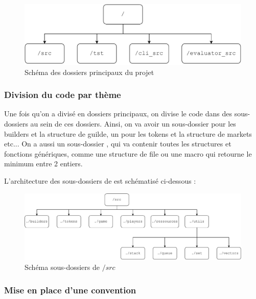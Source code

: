 \begin{center}
    \begin{figure}[H]
        \centering
        \includegraphics[width=.5\textwidth]{img/main_directories.pdf}
        \caption{Schéma des dossiers principaux du projet}
        \label{fig:main_dirs}
    \end{figure}
\end{center}




\subsubsection*{Division du code par thème}


    Une fois qu'on a divisé en dossiers principaux, on divise le code
dans des sous-dossiers au sein de ces dossiers. Ainsi, on va avoir un
sous-dossier pour les builders et la structure de guilde, un pour les 
tokens et la structure de markets etc... On a aussi un sous-dossier ,
qui va contenir toutes les structures et fonctions génériques, comme
une structure de file ou une macro  qui retourne le minimum entre 2 entiers.

    L'architecture des sous-dossiers de  est schématisé ci-dessous :


\begin{center}
    \begin{figure}[H]
        \centering
        \includegraphics[width=.8\textwidth]{img/src_sub_dir.pdf}
        \caption{Schéma sous-dossiers de $/src$}
        \label{fig:src_sub_dirs}
    \end{figure}
\end{center}




\subsubsection*{Mise en place d'une convention}


